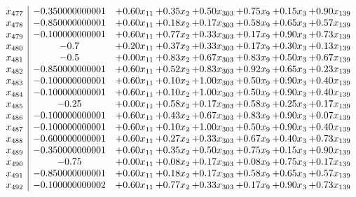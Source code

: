 \documentclass[8pt]{article}
\begin{document}
\[\begin{array}{c| c c@{\hskip 2pt} c@{\hskip 2pt} c@{\hskip 2pt} c@{\hskip 2pt} c@{\hskip 2pt} c@{\hskip 2pt} }
 x_{477}   &  -0.350000000001 & +  0.60 x_{11} & +  0.35 x_{2} & +  0.50 x_{303} & +  0.75 x_{9} & +  0.15 x_{3} & +  0.90 x_{139}\\
 x_{478}   &  -0.850000000001 & +  0.60 x_{11} & +  0.18 x_{2} & +  0.17 x_{303} & +  0.58 x_{9} & +  0.65 x_{3} & +  0.57 x_{139}\\
 x_{479}   &  -0.100000000001 & +  0.60 x_{11} & +  0.77 x_{2} & +  0.33 x_{303} & +  0.17 x_{9} & +  0.90 x_{3} & +  0.73 x_{139}\\
 x_{480}   &  -0.7 & +  0.20 x_{11} & +  0.37 x_{2} & +  0.33 x_{303} & +  0.17 x_{9} & +  0.30 x_{3} & +  0.13 x_{139}\\
 x_{481}   &  -0.5 & +  0.00 x_{11} & +  0.83 x_{2} & +  0.67 x_{303} & +  0.83 x_{9} & +  0.50 x_{3} & +  0.67 x_{139}\\
 x_{482}   &  -0.850000000001 & +  0.60 x_{11} & +  0.52 x_{2} & +  0.83 x_{303} & +  0.92 x_{9} & +  0.65 x_{3} & +  0.23 x_{139}\\
 x_{483}   &  -0.100000000001 & +  0.60 x_{11} & +  0.10 x_{2} & +  1.00 x_{303} & +  0.50 x_{9} & +  0.90 x_{3} & +  0.40 x_{139}\\
 x_{484}   &  -0.100000000001 & +  0.60 x_{11} & +  0.10 x_{2} & +  1.00 x_{303} & +  0.50 x_{9} & +  0.90 x_{3} & +  0.40 x_{139}\\
 x_{485}   &  -0.25 & +  0.00 x_{11} & +  0.58 x_{2} & +  0.17 x_{303} & +  0.58 x_{9} & +  0.25 x_{3} & +  0.17 x_{139}\\
 x_{486}   &  -0.100000000001 & +  0.60 x_{11} & +  0.43 x_{2} & +  0.67 x_{303} & +  0.83 x_{9} & +  0.90 x_{3} & +  0.07 x_{139}\\
 x_{487}   &  -0.100000000001 & +  0.60 x_{11} & +  0.10 x_{2} & +  1.00 x_{303} & +  0.50 x_{9} & +  0.90 x_{3} & +  0.40 x_{139}\\
 x_{488}   &  -0.600000000001 & +  0.60 x_{11} & +  0.27 x_{2} & +  0.33 x_{303} & +  0.67 x_{9} & +  0.40 x_{3} & +  0.73 x_{139}\\
 x_{489}   &  -0.350000000001 & +  0.60 x_{11} & +  0.35 x_{2} & +  0.50 x_{303} & +  0.75 x_{9} & +  0.15 x_{3} & +  0.90 x_{139}\\
 x_{490}   &  -0.75 & +  0.00 x_{11} & +  0.08 x_{2} & +  0.17 x_{303} & +  0.08 x_{9} & +  0.75 x_{3} & +  0.17 x_{139}\\
 x_{491}   &  -0.850000000001 & +  0.60 x_{11} & +  0.18 x_{2} & +  0.17 x_{303} & +  0.58 x_{9} & +  0.65 x_{3} & +  0.57 x_{139}\\
 x_{492}   &  -0.100000000002 & +  0.60 x_{11} & +  0.77 x_{2} & +  0.33 x_{303} & +  0.17 x_{9} & +  0.90 x_{3} & +  0.73 x_{139}\\

\end{array}\]
\end{document}
